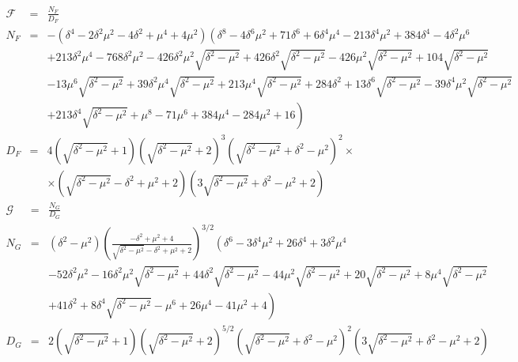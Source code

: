 \documentclass[10pt,a4paper]{article}
\begin{document}
\begin{eqnarray}\label{Ffun}
  \mathcal{F} & = & \frac{N_F}{D_F} \nonumber\\
  N_F & = &
 -\left(\delta ^4-2 \delta ^2 \mu ^2-4 \delta ^2+\mu ^4+4 \mu ^2\right) \left(\delta ^8-4
   \delta ^6 \mu ^2+71 \delta ^6+6 \delta ^4 \mu ^4-213 \delta ^4 \mu ^2+384 \delta ^4-4
   \delta ^2 \mu ^6 \right.\nonumber\\
   &&\left. +213 \delta ^2 \mu ^4-768 \delta ^2 \mu ^2-426 \delta ^2 \mu ^2
   \sqrt{\delta ^2-\mu ^2}+426 \delta ^2 \sqrt{\delta ^2-\mu ^2}-426 \mu ^2 \sqrt{\delta
   ^2-\mu ^2}+104 \sqrt{\delta ^2-\mu ^2}\right.\nonumber\\
   &&\left.-13 \mu ^6 \sqrt{\delta ^2-\mu ^2}+39 \delta ^2
   \mu ^4 \sqrt{\delta ^2-\mu ^2}+213 \mu ^4 \sqrt{\delta ^2-\mu ^2}+284 \delta ^2+13
   \delta ^6 \sqrt{\delta ^2-\mu ^2}-39 \delta ^4 \mu ^2 \sqrt{\delta ^2-\mu ^2}\right.\nonumber\\
   &&\left.+213
   \delta ^4 \sqrt{\delta ^2-\mu ^2}+\mu ^8-71 \mu ^6+384 \mu ^4-284 \mu ^2+16\right)\nonumber\\
   D_F & = & 4 \left(\sqrt{\delta ^2-\mu ^2}+1\right) \left(\sqrt{\delta ^2-\mu ^2}+2\right)^3
   \left(\sqrt{\delta ^2-\mu ^2}+\delta ^2-\mu ^2\right)^2 \times \nonumber\\
   &&\times  \left(\sqrt{\delta ^2-\mu
   ^2}-\delta ^2+\mu ^2+2\right) \left(3 \sqrt{\delta ^2-\mu ^2}+\delta ^2-\mu
   ^2+2\right)
\end{eqnarray}
\begin{eqnarray}
\label{Gfun}
  \mathcal{G} &=& \frac{N_G}{D_G} \nonumber\\
  N_G & = & \left(\delta ^2-\mu ^2\right) \left(\frac{-\delta ^2+\mu ^2+4}{\sqrt{\delta ^2-\mu
   ^2}-\delta ^2+\mu ^2+2}\right)^{3/2} \left(\delta ^6-3 \delta ^4 \mu ^2+26 \delta
   ^4+3 \delta ^2 \mu ^4 \right.\nonumber\\
   &&\left.-52 \delta ^2 \mu ^2-16 \delta ^2 \mu ^2 \sqrt{\delta ^2-\mu
   ^2}+44 \delta ^2 \sqrt{\delta ^2-\mu ^2}-44 \mu ^2 \sqrt{\delta ^2-\mu ^2}+20
   \sqrt{\delta ^2-\mu ^2}+8 \mu ^4 \sqrt{\delta ^2-\mu ^2}\right.\nonumber\\
   &&\left. +41 \delta ^2+8 \delta ^4
   \sqrt{\delta ^2-\mu ^2}-\mu ^6+26 \mu ^4-41 \mu ^2+4\right)\nonumber\\
  D_G &=& 2 \left(\sqrt{\delta ^2-\mu ^2}+1\right) \left(\sqrt{\delta ^2-\mu ^2}+2\right)^{5/2}
   \left(\sqrt{\delta ^2-\mu ^2}+\delta ^2-\mu ^2\right)^2 \left(3 \sqrt{\delta ^2-\mu
   ^2}+\delta ^2-\mu ^2+2\right)
\end{eqnarray}
\end{document}
